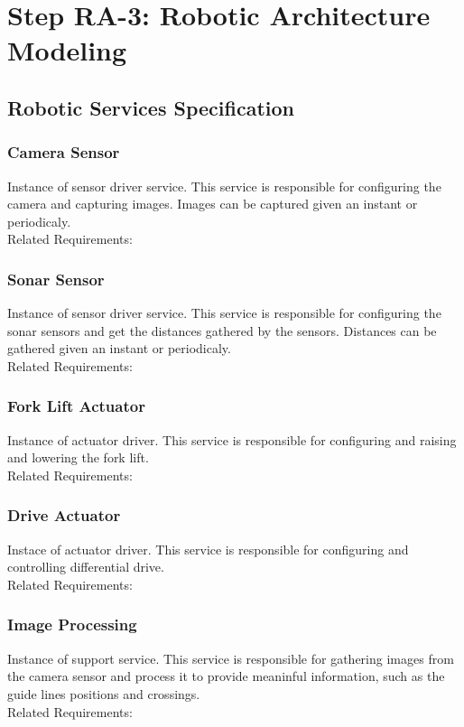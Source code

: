 \section{Step RA-3: Robotic Architecture Modeling}
\subsection{Robotic Services Specification}
\subsubsection*{Camera Sensor}
Instance of sensor driver service. This service is responsible for configuring the camera and capturing images. Images can be captured given an instant or periodicaly.
\\Related Requirements:

\subsubsection*{Sonar Sensor}
Instance of sensor driver service. This service is responsible for configuring the sonar sensors and get the distances gathered by the sensors. Distances can be gathered given an instant or periodicaly.
\\Related Requirements:

\subsubsection*{Fork Lift Actuator}
Instance of actuator driver. This service is responsible for configuring and raising and lowering the fork lift.
\\Related Requirements:

\subsubsection*{Drive Actuator}
Instace of actuator driver. This service is responsible for configuring and controlling differential drive.
\\Related Requirements:

\subsubsection*{Image Processing}
Instance of support service. This service is responsible for gathering images from the camera sensor and process it to provide meaninful information, such as the guide lines positions and crossings.
\\Related Requirements:

